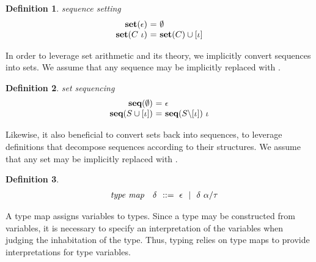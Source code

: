 \documentclass[acmsmall]{acmart}
\theoremstyle{definition}
\newtheorem{definition}{Definition}[section]
\begin{document}
\begin{definition} 
  \label{def:sequence_setting}
  \emph{sequence setting}
  \hfill 
  \small
  \nopad
  \[
  \begin{array}[t]{r@{}c@{}l}
      \textbf{set}(\epsilon)
      &\ =\ & 
      \emptyset 

      \\

      \textbf{set}(C\ \iota)
      &\ =\ & 
      \textbf{set}(C) \cup [ \iota ] 
  \end{array}
  \]
\end{definition} 

\noindent
In order to leverage set arithmetic and its theory,
we implicitly convert sequences into sets. 
We assume that any sequence  may be implicitly replaced with .

\begin{definition} 
  \label{def:set_sequencing}
  \emph{set sequencing}
  \hfill 
  \small
  \nopad
  \\
  \[
  \begin{array}[t]{r@{}c@{}l}
      \textbf{seq}(\emptyset)
      &\ =\ & 
      \epsilon 

      \\

      \textbf{seq}(S \cup [\iota])
      &\ =\ & 
      \textbf{seq}(S \backslash [\iota])\ \iota 
  \end{array}
  \]
\end{definition} 

\noindent
Likewise, it also beneficial to convert sets back into sequences, to leverage
definitions that decompose sequences according to their structures. 
We assume that any set  may be implicitly replaced with .

\begin{definition}
  \label{def:type_map}
  \small
  \nopad
  \[\begin{array}[t]{rr@{}l}
    \com{type map} &
    \nonterm{\delta} & \is \epsilon \sep \delta\ \alpha \slash \tau
  \end{array}\]
\end{definition}

\noindent
A type map assigns variables to types.
Since a type may be constructed from variables, it 
is necessary to specify an interpretation of the variables
when judging the inhabitation of the type.
Thus, typing relies on type maps to provide interpretations
for type variables.
\end{document}
